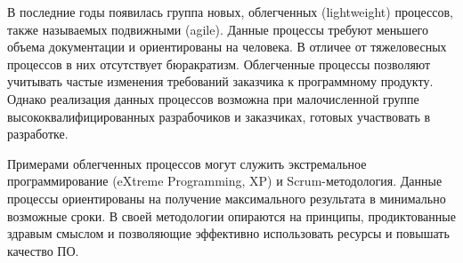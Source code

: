 В последние годы появилась группа новых, облегченных (lightweight) 
процессов, также называемых подвижными (agile). Данные процессы 
требуют меньшего объема документации и ориентированы на человека. 
В отличее от тяжеловесных процессов в них отсутствует бюракратизм. 
Облегченные процессы позволяют учитывать частые изменения требований 
заказчика к программному продукту. Однако реализация данных процессов 
возможна при малочисленной группе высококвалифицированных разрабочиков 
и заказчиках, готовых участвовать в разработке. 

Примерами облегченных процессов могут служить экстремальное 
программирование (eXtreme Programming, XP) и Scrum-методология. 
Данные процессы ориентированы на получение максимального результата 
в минимально возможные сроки. В своей методологии опираются на принципы, 
продиктованные здравым смыслом и позволяющие эффективно использовать 
ресурсы и повышать качество ПО.
  
\endinput
